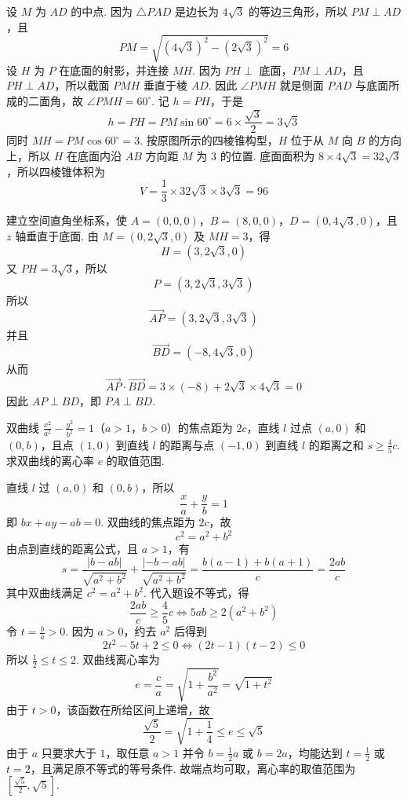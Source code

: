 \begin{solution}
设 \(M\) 为 \(AD\) 的中点. 因为 \(\triangle PAD\) 是边长为 \(4\sqrt3\) 的等边三角形，所以 \(PM\perp AD\)，且
\[
PM=\sqrt{\left(4\sqrt3\right)^2-\left(2\sqrt3\right)^2}=6
\]
设 \(H\) 为 \(P\) 在底面的射影，并连接 \(MH\). 因为 \(PH\perp\) 底面，\(PM\perp AD\)，且 \(PH\perp AD\)，所以截面 \(PMH\) 垂直于棱 \(AD\). 因此 \(\angle PMH\) 就是侧面 \(PAD\) 与底面所成的二面角，故 \(\angle PMH=60^{\circ}\). 记 \(h=PH\)，于是
\[
h=PH=PM\sin60^{\circ}=6\times\frac{\sqrt3}{2}=3\sqrt3
\]
同时 \(MH=PM\cos60^{\circ}=3\). 按原图所示的四棱锥构型，\(H\) 位于从 \(M\) 向 \(B\) 的方向上，所以 \(H\) 在底面内沿 \(AB\) 方向距 \(M\) 为 \(3\) 的位置.
底面面积为 \(8\times4\sqrt3=32\sqrt3\)，所以四棱锥体积为
\[
V=\frac13\times32\sqrt3\times3\sqrt3=96
\]

建立空间直角坐标系，使 \(A=(0,0,0)\)，\(B=(8,0,0)\)，\(D=(0,4\sqrt3,0)\)，且 \(z\) 轴垂直于底面. 由 \(M=(0,2\sqrt3,0)\) 及 \(MH=3\)，得
\[
H=(3,2\sqrt3,0)
\]
又 \(PH=3\sqrt3\)，所以
\[
P=(3,2\sqrt3,3\sqrt3)
\]
所以
\[
\overrightarrow{AP}=(3,2\sqrt3,3\sqrt3)
\]
并且
\[
\overrightarrow{BD}=(-8,4\sqrt3,0)
\]
从而
\[
\overrightarrow{AP}\cdot\overrightarrow{BD}=3\times(-8)+2\sqrt3\times4\sqrt3=0
\]
因此 \(AP\perp BD\)，即 \(PA\perp BD\).
\end{solution}

\begin{problem}
双曲线 \(\frac{x^2}{a^2} - \frac{y^2}{b^2} = 1\)（\(a > 1\)，\(b > 0\)）的焦点距为 \(2c\)，直线 \(l\) 过点 \((a,0)\) 和 \((0,b)\)，且点 \((1,0)\) 到直线 \(l\) 的距离与点 \((-1,0)\) 到直线 \(l\) 的距离之和 \(s \geqslant \frac{4}{5} c\). 求双曲线的离心率 \(e\) 的取值范围.
\end{problem}

\begin{solution}
直线 \(l\) 过 \((a,0)\) 和 \((0,b)\)，所以
\[
\frac{x}{a}+\frac{y}{b}=1
\]
即 \(bx+ay-ab=0\). 双曲线的焦点距为 \(2c\)，故
\[
c^2=a^2+b^2
\]
由点到直线的距离公式，且 \(a>1\)，有
\[
s=\frac{|b-ab|}{\sqrt{a^2+b^2}}+\frac{|-b-ab|}{\sqrt{a^2+b^2}}
 =\frac{b(a-1)+b(a+1)}{c}=\frac{2ab}{c}
\]
其中双曲线满足 \(c^2=a^2+b^2\). 代入题设不等式，得
\[
\frac{2ab}{c}\geqslant\frac45c
\Longleftrightarrow 5ab\geqslant2(a^2+b^2)
\]
令 \(t=\frac ba>0\). 因为 \(a>0\)，约去 \(a^2\) 后得到
\[
2t^2-5t+2\leqslant0
\Longleftrightarrow (2t-1)(t-2)\leqslant0
\]
所以 \(\frac12\leqslant t\leqslant2\). 双曲线离心率为
\[
e=\frac ca=\sqrt{1+\frac{b^2}{a^2}}=\sqrt{1+t^2}
\]
由于 \(t>0\)，该函数在所给区间上递增，故
\[
\frac{\sqrt5}{2}=\sqrt{1+\frac14}\leqslant e\leqslant\sqrt5
\]
由于 \(a\) 只要求大于 \(1\)，取任意 \(a>1\) 并令 \(b=\frac12a\) 或 \(b=2a\)，均能达到 \(t=\frac12\) 或 \(t=2\)，且满足原不等式的等号条件. 故端点均可取，离心率的取值范围为 \(\left[\frac{\sqrt5}{2},\sqrt5\right]\).
\end{solution}

